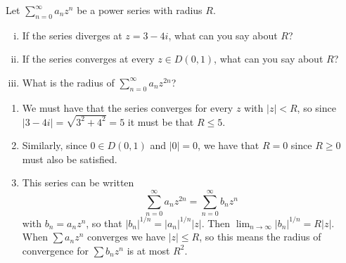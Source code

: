 \documentclass{article}
\newcounter{Problem}
\newenvironment{Problem}{\begin{Exercise}[name={Problem},
                                          counter={Problem}]}
                        {\end{Exercise}}
\begin{document}
\begin{Problem}
  Let $\sum_{n=0}^\infty a_n z^n$ be a power series with radius $R$.
  \begin{enumerate}[(i)]
    \item{
      If the series diverges at $z = 3 - 4i$, what can you say about $R$?
    }
    \item{
      If the series converges at every $z \in D(0, 1)$, what can you say about
      $R$?
    }
    \item{
      What is the radius of $\sum_{n=0}^\infty a_n z^{2n}$?
    }
  \end{enumerate}
\end{Problem}

\begin{Answer}
  \begin{enumerate}
    \item{
      We must have that the series converges for every $z$ with $|z| <
      R$, so since $|3 - 4i| = \sqrt{3^2 + 4^2} = 5$ it must be that
      $R \leq 5$.
    }
    \item{
      Similarly, since $0 \in D(0,1)$ and $|0| = 0$, we have that
      $R = 0$ since $R \geq 0$ must also be satisfied.
    }
    \item{
      This series can be written
      $$
      \sum_{n=0}^\infty a_n z^{2n} = \sum_{n=0}^\infty b_n z^n
      $$
      with $b_n = a_n z^n$, so that
      $|b_n|^{1 / n} = |a_n|^{1 / n} |z|$. Then
      $\lim_{n \to \infty} |b_n|^{1 / n} = R|z|$. When
      $\sum a_n z^n$ converges we have $|z| \leq R$,
      so this means the radius of convergence for
      $\sum b_n z^n$ is at most $R^2$.
    }
  \end{enumerate}
\end{Answer}
\end{document}
